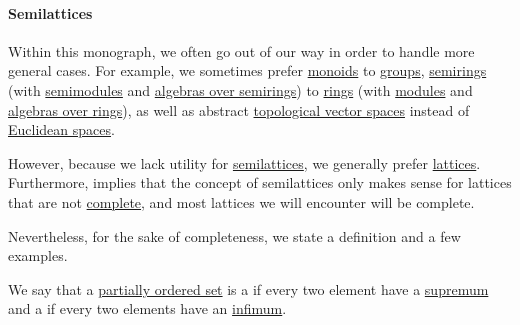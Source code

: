 \paragraph{Semilattices}

\begin{remark}\label{rem:semilattices}
  Within this monograph, we often go out of our way in order to handle more general cases. For example, we sometimes prefer \hyperref[def:monoid]{monoids} to \hyperref[def:group]{groups}, \hyperref[def:semiring]{semirings} (with \hyperref[def:semimodule]{semimodules} and \hyperref[def:algebra_over_semiring]{algebras over semirings}) to \hyperref[def:ring]{rings} (with \hyperref[def:module]{modules} and \hyperref[def:algebra_over_ring]{algebras over rings}), as well as abstract \hyperref[def:topological_vector_space]{topological vector spaces} instead of \hyperref[def:euclidean_space]{Euclidean spaces}.

  However, because we lack utility for \hyperref[def:semilattice]{semilattices}, we generally prefer \hyperref[def:lattice]{lattices}. Furthermore,  implies that the concept of semilattices only makes sense for lattices that are not \hyperref[def:complete_lattice]{complete}, and most lattices we will encounter will be complete.

  Nevertheless, for the sake of completeness, we state a definition and a few examples.
\end{remark}

\begin{definition}\label{def:semilattice}
  We say that a \hyperref[def:partially_ordered_set]{partially ordered set} is a  if every two element have a \hyperref[def:extremal_points/supremum_and_infimum]{supremum} and a  if every two elements have an \hyperref[def:extremal_points/supremum_and_infimum]{infimum}.
\end{definition}

